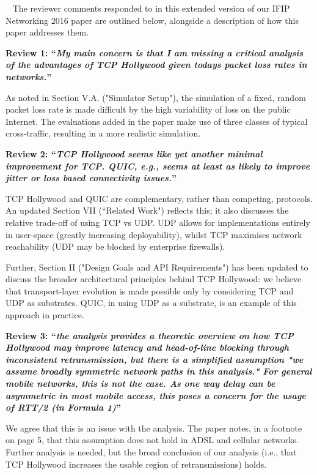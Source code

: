 \documentclass{letter}
\begin{document}
\begin{letter}{~}
The reviewer comments responded to in this extended version of our IFIP Networking 2016
paper are outlined below, alongside a description of how this paper addresses them.

\textbf{Review 1: ``\emph{My main concern is that I am missing a critical analysis of the advantages
of TCP Hollywood given todays packet loss rates in networks.}''}

As noted in Section V.A. ("Simulator Setup"), the simulation of a fixed, random packet
loss rate is made difficult by the high variability of loss on the public Internet. The
evaluations added in the paper make use of three classes of typical cross-traffic,
resulting in a more realistic simulation.

\textbf{Review 2: ``\emph{TCP Hollywood seems like yet another
minimal improvement for TCP. QUIC, e.g., seems at least as likely to
improve jitter or loss based connectivity issues.}''}

TCP Hollywood and QUIC are complementary, rather than competing, protocols.
An updated Section VII (``Related Work") reflects this; it also discusses
the relative trade-off of using TCP vs UDP. UDP allows for implementations entirely
in user-space (greatly increasing deployability), whilst TCP maximises network reachability
(UDP may be blocked by enterprise firewalls).

Further, Section II ("Design Goals and API Requirements") has been updated to discuss the
broader architectural principles behind TCP Hollywood: we believe that transport-layer
evolution is made possible only by considering TCP and UDP as substrates. QUIC, in using
UDP as a substrate, is an example of this approach in practice.

\textbf{Review 3: ``\emph{the analysis provides a theoretic overview on how TCP Hollywood may
improve latency and head-of-line blocking through inconsistent
retransmission, but there is a simplified assumption "we assume broadly
symmetric network paths in this analysis." For general mobile networks,
this is not the case. As one way delay can be asymmetric in most mobile
access, this poses a concern for the usage of RTT/2 (in Formula 1)}''}

We agree that this is an issue with the analysis. The paper notes, in a footnote on page 5,
that this assumption does not hold in ADSL and cellular networks. Further analysis is needed,
but the broad conclusion of our analysis (i.e., that TCP Hollywood increases the usable
region of retransmissions) holds.


\end{letter}
\end{document}
